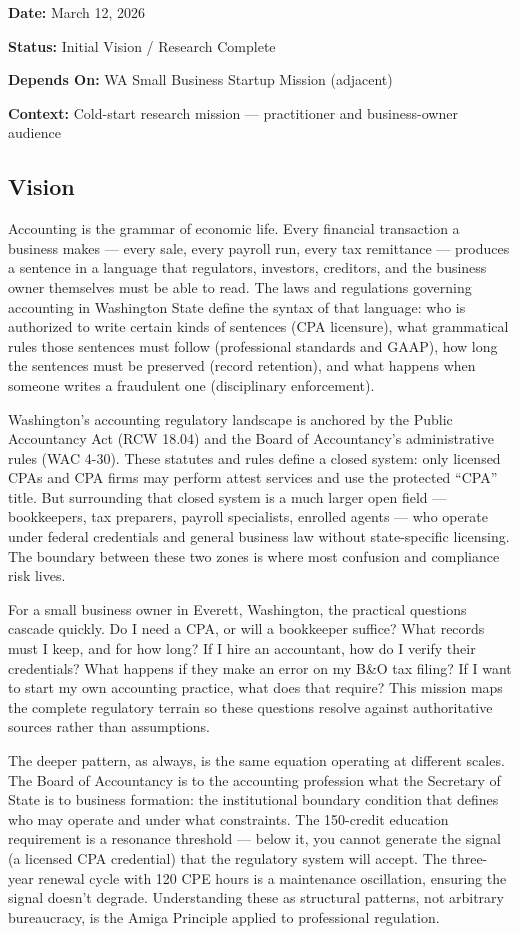 \documentclass[11pt,letterpaper]{article}
\newcommand{\metafield}[2]{\textbf{\sffamily #1} #2\par}
\begin{document}
\metafield{Date:}{March 12, 2026}
\metafield{Status:}{Initial Vision / Research Complete}
\metafield{Depends On:}{WA Small Business Startup Mission (adjacent)}
\metafield{Context:}{Cold-start research mission --- practitioner and business-owner audience}

\subsection{Vision}

Accounting is the grammar of economic life. Every financial transaction a business makes --- every sale, every payroll run, every tax remittance --- produces a sentence in a language that regulators, investors, creditors, and the business owner themselves must be able to read. The laws and regulations governing accounting in Washington State define the syntax of that language: who is authorized to write certain kinds of sentences (CPA licensure), what grammatical rules those sentences must follow (professional standards and GAAP), how long the sentences must be preserved (record retention), and what happens when someone writes a fraudulent one (disciplinary enforcement).

Washington's accounting regulatory landscape is anchored by the Public Accountancy Act (RCW 18.04) and the Board of Accountancy's administrative rules (WAC 4-30). These statutes and rules define a closed system: only licensed CPAs and CPA firms may perform attest services and use the protected ``CPA'' title. But surrounding that closed system is a much larger open field --- bookkeepers, tax preparers, payroll specialists, enrolled agents --- who operate under federal credentials and general business law without state-specific licensing. The boundary between these two zones is where most confusion and compliance risk lives.

For a small business owner in Everett, Washington, the practical questions cascade quickly. Do I need a CPA, or will a bookkeeper suffice? What records must I keep, and for how long? If I hire an accountant, how do I verify their credentials? What happens if they make an error on my B\&O tax filing? If I want to start my own accounting practice, what does that require? This mission maps the complete regulatory terrain so these questions resolve against authoritative sources rather than assumptions.

The deeper pattern, as always, is the same equation operating at different scales. The Board of Accountancy is to the accounting profession what the Secretary of State is to business formation: the institutional boundary condition that defines who may operate and under what constraints. The 150-credit education requirement is a resonance threshold --- below it, you cannot generate the signal (a licensed CPA credential) that the regulatory system will accept. The three-year renewal cycle with 120 CPE hours is a maintenance oscillation, ensuring the signal doesn't degrade. Understanding these as structural patterns, not arbitrary bureaucracy, is the Amiga Principle applied to professional regulation.
\end{document}
